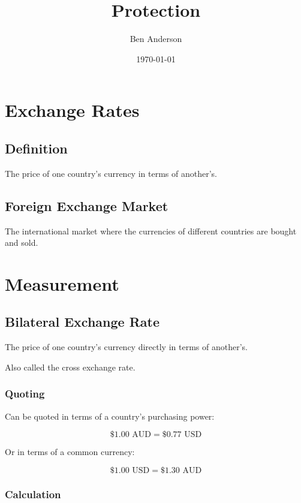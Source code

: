 \documentclass[a4paper,11pt]{article}
\begin{document}
\title{Protection}
\author{Ben Anderson}
\date{\today}
\maketitle
\pagebreak

\tableofcontents
\pagebreak


\section{Exchange Rates}

\subsection{Definition}

The price of one country's currency in terms of another's.

\subsection{Foreign Exchange Market}

The international market where the currencies of different countries are bought
and sold.




\section{Measurement}

\subsection{Bilateral Exchange Rate}

The price of one country's currency directly in terms of another's.

Also called the cross exchange rate.


\subsubsection{Quoting}

Can be quoted in terms of a country's purchasing power:

$$
\$1.00\text{ AUD} = \$0.77\text{ USD}
$$

Or in terms of a common currency:

$$
\$1.00\text{ USD} = \$1.30\text{ AUD}
$$


\subsubsection{Calculation}
\end{document}

